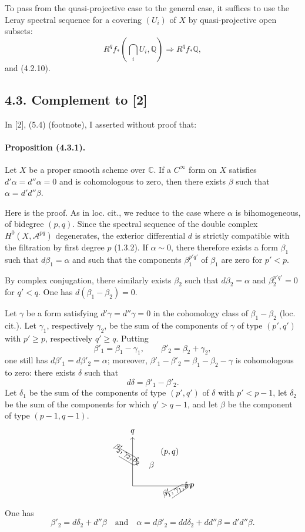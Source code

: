 \documentclass[10pt]{article}
\newcommand{\C}{\mathbb C}
\newcommand{\Q}{\mathbb Q}
\begin{document}
To pass from the quasi-projective case to the general case, it suffices to use the Leray spectral sequence for a covering $(U_i)$ of $X$ by quasi-projective open subsets:
\[
R^qf_*(\bigcap_i U_i,\Q)\Longrightarrow R^qf_*\Q,
\]
and (4.2.10).

\subsection*{4.3. Complement to [2]}

In [2], (5.4) (footnote), I asserted without proof that:

\paragraph{Proposition (4.3.1).} Let $X$ be a proper smooth scheme over $\C$. If a $C^\infty$ form on $X$ satisfies $d'\alpha=d''\alpha=0$ and is cohomologous to zero, then there exists $\beta$ such that $\alpha=d'd''\beta$.

Here is the proof. As in loc. cit., we reduce to the case where $\alpha$ is bihomogeneous, of bidegree $(p,q)$. Since the spectral sequence of the double complex $H^0(X,\mathcal A^{pq})$ degenerates, the exterior differential $d$ is strictly compatible with the filtration by first degree $p$ (1.3.2). If $\alpha\sim0$, there therefore exists a form $\beta_1$ such that $d\beta_1=\alpha$ and such that the components $\beta_1^{p'q'}$ of $\beta_1$ are zero for $p'<p$.

By complex conjugation, there similarly exists $\beta_2$ such that $d\beta_2=\alpha$ and $\beta_2^{p'q'}=0$ for $q'<q$. One has $d(\beta_1-\beta_2)=0$.

Let $\gamma$ be a form satisfying $d'\gamma=d''\gamma=0$ in the cohomology class of $\beta_1-\beta_2$ (loc. cit.). Let $\gamma_1$, respectively $\gamma_2$, be the sum of the components of $\gamma$ of type $(p',q')$ with $p'\ge p$, respectively $q'\ge q$. Putting
\[
\beta'_1=\beta_1-\gamma_1,\qquad \beta'_2=\beta_2+\gamma_2,
\]
one still has $d\beta'_1=d\beta'_2=\alpha$; moreover, $\beta'_1-\beta'_2=\beta_1-\beta_2-\gamma$ is cohomologous to zero: there exists $\delta$ such that
\[
d\delta=\beta'_1-\beta'_2.
\]
Let $\delta_1$ be the sum of the components of type $(p',q')$ of $\delta$ with $p'<p-1$, let $\delta_2$ be the sum of the components for which $q'>q-1$, and let $\beta$ be the component of type $(p-1,q-1)$.
\[
\begin{tikzpicture}[scale=.65,baseline=(current bounding box.center)]
\draw[->] (0,0)--(3.6,0) node[right] {$p$};
\draw[->] (0,0)--(0,3.2) node[above] {$q$};
\node at (2.45,2.25) {$(p,q)$};
\node at (1.25,1.35) {$\beta$};
\draw[rounded corners] (-.9,2.5)--(.35,1.8)--(.2,1.3)--(-.9,1.95);
\node[rotate=-35] at (-.35,2.08) {$\beta'_2,\gamma_2,\delta_2$};
\draw[rounded corners] (2.1,-.55)--(3.35,.15)--(3.85,.05)--(2.6,-.8);
\node[rotate=20] at (2.95,-.22) {$\beta'_1,\gamma_1,\delta_1$};
\end{tikzpicture}
\]
One has
\[
\beta'_2=d\delta_2+d''\beta
\quad\text{and}\quad
\alpha=d\beta'_2=dd\delta_2+dd''\beta=d'd''\beta.
\]
\end{document}
